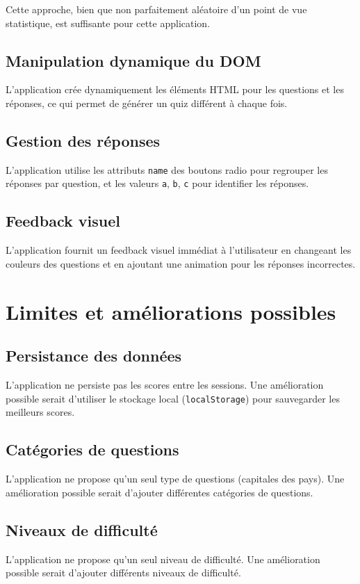 \documentclass{article}
\begin{document}
Cette approche, bien que non parfaitement aléatoire d'un point de vue statistique, est suffisante pour cette application.

\subsection{Manipulation dynamique du DOM}
L'application crée dynamiquement les éléments HTML pour les questions et les réponses, ce qui permet de générer un quiz différent à chaque fois.

\subsection{Gestion des réponses}
L'application utilise les attributs \texttt{name} des boutons radio pour regrouper les réponses par question, et les valeurs \texttt{a}, \texttt{b}, \texttt{c} pour identifier les réponses.

\subsection{Feedback visuel}
L'application fournit un feedback visuel immédiat à l'utilisateur en changeant les couleurs des questions et en ajoutant une animation pour les réponses incorrectes.

\section{Limites et améliorations possibles}

\subsection{Persistance des données}
L'application ne persiste pas les scores entre les sessions. Une amélioration possible serait d'utiliser le stockage local (\texttt{localStorage}) pour sauvegarder les meilleurs scores.

\subsection{Catégories de questions}
L'application ne propose qu'un seul type de questions (capitales des pays). Une amélioration possible serait d'ajouter différentes catégories de questions.

\subsection{Niveaux de difficulté}
L'application ne propose qu'un seul niveau de difficulté. Une amélioration possible serait d'ajouter différents niveaux de difficulté.
\end{document}
